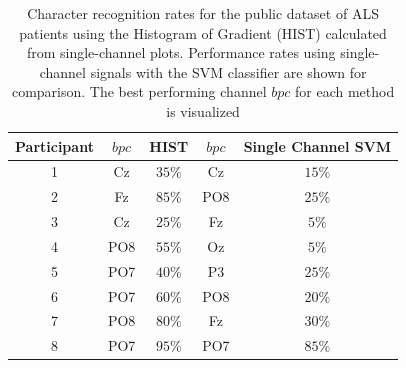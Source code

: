 \begin{table}[htb]
\caption[Single Channel Character Recognition Rates for ALS patient's Dataset]{Character recognition rates for the public dataset of ALS patients using the Histogram of Gradient (HIST) calculated from  single-channel plots.  Performance rates using single-channel signals with the SVM classifier are shown for comparison.  The best performing channel $bpc$ for each method is visualized}
\centering
\begin{tabular}{c|cc|cc}
\toprule
\textbf{Participant}	&  $bpc$ 	&  HIST &  $bpc$	&  Single Channel SVM \\
\midrule
1     &     Cz   &   $35\%$    &  Cz   & $15\%$   \\
2     &     Fz   &   $85\%$      &  PO8   & $25\%$   \\
3     &     Cz   &   $25\%$    &  Fz   & $5\%$   \\
4     &     PO8 &   $55\%$   &  Oz   & $5\%$    \\
5     &     PO7 &   $40\%$    &  P3   & $25\%$   \\
6     &     PO7 &   $60\%$  &  PO8   & $20\%$    \\
7     &     PO8 &   $80\%$   &  Fz   & $30\%$     \\
8     &     PO7 &   $95\%$     &  PO7   & $85\%$ \\

\end{tabular}
\label{tab:resultsals}
\end{table}


